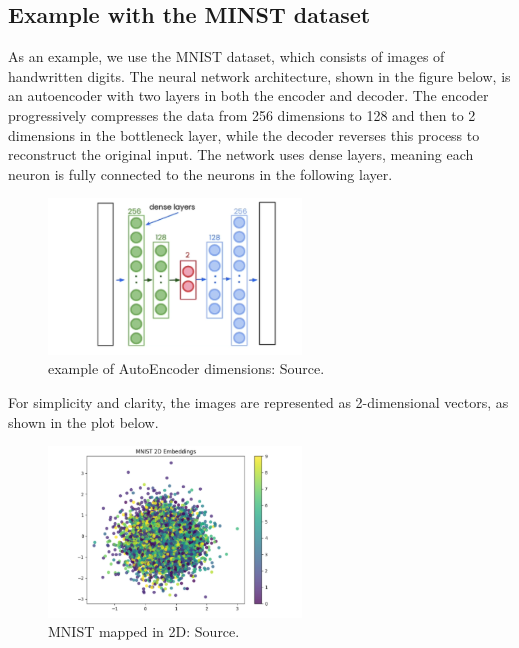\subsection{Example with the MINST dataset}
As an example, we use the MNIST dataset, which consists of images of handwritten digits. The neural network architecture, shown in the figure below, is an autoencoder with two layers in both the encoder and decoder. The encoder progressively compresses the data from 256 dimensions to 128 and then to 2 dimensions in the bottleneck layer, while the decoder reverses this process to reconstruct the original input. The network uses dense layers, meaning each neuron is fully connected to the neurons in the following layer.
\begin{figure}[h]
    \centering
    \includegraphics[width=0.6\textwidth]{IMAGES/immagine_2025-02-26_154914801.png}
    \caption{example of AutoEncoder dimensions:
 Source.\footnotemark[3]}
    \label{fig:2D}
\end{figure}

For simplicity and clarity, the images are represented as 2-dimensional vectors, as shown in the plot below.

\begin{figure}[h]
    \centering
    \includegraphics[width=0.6\textwidth]{IMAGES/immagine_2025-02-26_155006209.png}
    \caption{MNIST mapped in 2D:
 Source.\footnotemark[3]}
    \label{fig:2D}
\end{figure}



